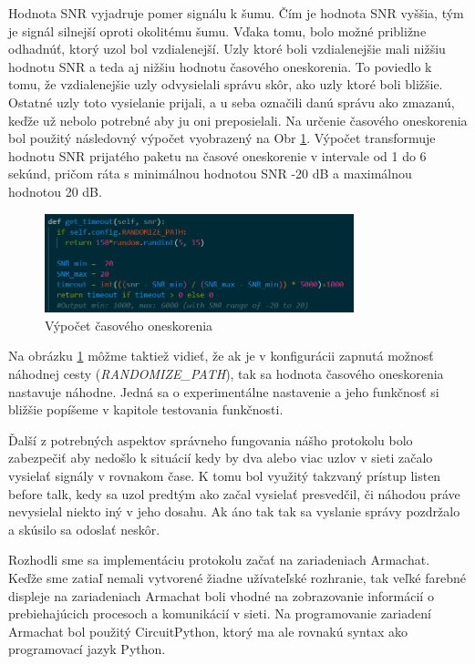 \documentclass[slovak,master]{diploma}
\begin{document}
Hodnota SNR vyjadruje pomer signálu k šumu. Čím je hodnota SNR vyššia, tým je signál silnejší oproti okolitému šumu.
Vďaka tomu, bolo možné približne odhadnúť, ktorý uzol bol vzdialenejší. Uzly ktoré boli vzdialenejšie mali nižšiu hodnotu SNR a teda aj nižšiu hodnotu časového oneskorenia.
To poviedlo k tomu, že vzdialenejšie uzly odvysielali správu skôr, ako uzly ktoré boli bližšie. Ostatné uzly toto vysielanie prijali, a u seba označili danú správu ako zmazanú, 
keďže už nebolo potrebné aby ju oni preposielali. Na určenie časového oneskorenia bol použitý následovný výpočet vyobrazený na Obr \ref{fig:getTimeout}. Výpočet transformuje hodnotu 
SNR prijatého paketu na časové oneskorenie v intervale od 1 do 6 sekúnd, pričom ráta s minimálnou hodnotou SNR -20 dB a maximálnou hodnotou 20 dB. 
\begin{figure}[h!]
	\centering
	\includegraphics[width=0.8\textwidth]{Figures/getTimeout.png}
	\caption{Výpočet časového oneskorenia}
	\label{fig:getTimeout}
\end{figure}

Na obrázku \ref{fig:getTimeout} môžme taktiež vidieť, že ak je v konfigurácii zapnutá možnosť náhodnej cesty (\emph{RANDOMIZE\_PATH}), tak sa hodnota časového oneskorenia nastavuje náhodne. 
Jedná sa o experimentálne nastavenie a jeho funkčnosť si bližšie popíšeme v kapitole testovania funkčnosti.

Ďalší z potrebných aspektov správneho fungovania nášho protokolu bolo zabezpečiť aby nedošlo k situácií kedy by dva alebo viac uzlov v sieti začalo vysielať signály v rovnakom čase.
K tomu bol využitý takzvaný prístup listen before talk, kedy sa uzol predtým ako začal vysielať presvedčil, či náhodou práve nevysielal niekto iný v jeho dosahu. Ak áno tak tak sa vyslanie správy pozdržalo 
a skúsilo sa odoslať neskôr.

Rozhodli sme sa implementáciu protokolu začať na zariadeniach Armachat. Keďže sme zatiaľ nemali vytvorené žiadne užívateľské rozhranie, tak veľké farebné displeje na zariadeniach Armachat 
boli vhodné na zobrazovanie informácií o prebiehajúcich procesoch a komunikácií v sieti. Na programovanie zariadení Armachat bol použitý CircuitPython, ktorý ma ale rovnakú syntax ako 
programovací jazyk Python.
\end{document}
